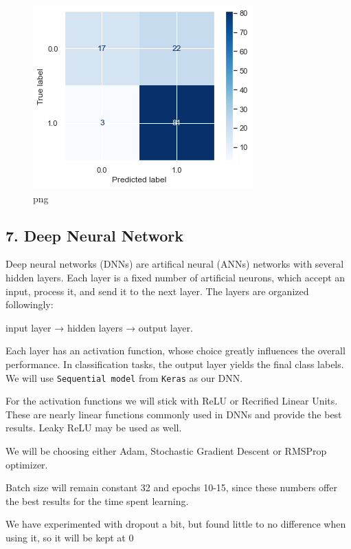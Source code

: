 \documentclass[]{article}
\begin{document}
\begin{figure}
\centering
\includegraphics{notebook_files/notebook_52_3.png}
\caption{png}
\end{figure}

\hypertarget{deep-neural-network}{%
\subsection{7. Deep Neural Network}\label{deep-neural-network}}

Deep neural networks (DNNs) are artifical neural (ANNs) networks with
several hidden layers. Each layer is a fixed number of artificial
neurons, which accept an input, process it, and send it to the next
layer. The layers are organized followingly:

input layer → hidden layers → output layer.

Each layer has an activation function, whose choice greatly influences
the overall performance. In classification tasks, the output layer
yields the final class labels. We will use \texttt{Sequential\ model}
from \texttt{Keras} as our DNN.

For the activation functions we will stick with ReLU or Recrified Linear
Units. These are nearly linear functions commonly used in DNNs and
provide the best results. Leaky ReLU may be used as well.

We will be choosing either Adam, Stochastic Gradient Descent or RMSProp
optimizer.

Batch size will remain constant 32 and epochs 10-15, since these numbers
offer the best results for the time spent learning.

We have experimented with dropout a bit, but found little to no
difference when using it, so it will be kept at 0
\end{document}
